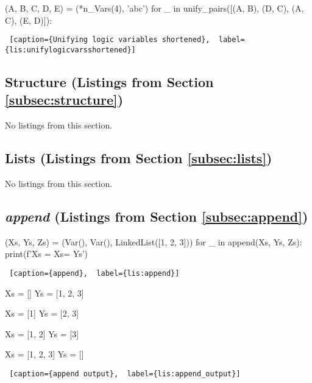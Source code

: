 \noindent
\begin{minipage}{\linewidth} \largev  
\begin{python}
(A, B, C, D, E) = (*n_Vars(4), 'abc')
for _ in unify_pairs([(A, B), (D, C), (A, C), (E, D)]):
\end{python}
\begin{lstlisting} [caption={Unifying logic variables shortened},  label={lis:unifylogicvarsshortened}]
\end{lstlisting}
\end{minipage}

\subsection{Structure (Listings from Section \ref{subsec:structure})} \label{appsubsec:structure}
No listings from this section.

\subsection{Lists (Listings from Section \ref{subsec:lists})} \label{appsubsec:lists}
No listings from this section.

\subsection{\textit{append} (Listings from Section \ref{subsec:append})} \label{appsubsec:append}

\begin{minipage}{\linewidth} \hrulefill
\begin{python}
(Xs, Ys, Zs) = (Var(), Var(), LinkedList([1, 2, 3]))
for _ in append(Xs, Ys, Zs):
  print(f'Xs = {Xs}\nYs = {Ys}\n')
\end{python}
\begin{lstlisting} [caption={append},  label={lis:append}]
\end{lstlisting}
\end{minipage}

\noindent
\begin{minipage}{\linewidth}  \largev 
\begin{python}
Xs = []
Ys = [1, 2, 3]

Xs = [1]
Ys = [2, 3]

Xs = [1, 2]
Ys = [3]

Xs = [1, 2, 3]
Ys = []
\end{python}
\begin{lstlisting} [caption={append output},  label={lis:append_output}]
\end{lstlisting}
\end{minipage}
\smallv

